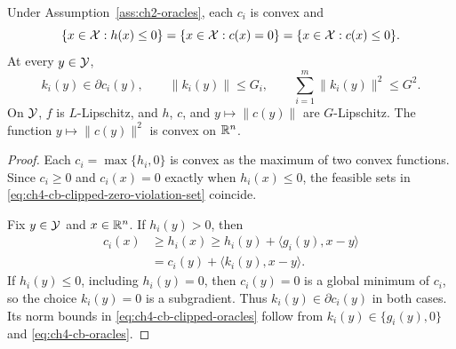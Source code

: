 \begin{Thm:Lemma}\label{lem:ch4-cb-lipschitz}
Under Assumption~\ref{ass:ch2-oracles}, each $c_i$ is convex and
\begin{equation}\label{eq:ch4-cb-clipped-zero-violation-set}
\{x\in\mathcal{X}:h(x)\le0\}
=\{x\in\mathcal{X}:c(x)=0\}
=\{x\in\mathcal{X}:c(x)\le0\}.
\end{equation}
At every $y\in\mathcal{Y}$,
\begin{equation}\label{eq:ch4-cb-clipped-oracles}
k_i(y)\in\partial c_i(y),\qquad
\|k_i(y)\|\le G_i,\qquad
\sum_{i=1}^m\|k_i(y)\|^2\le G^2.
\end{equation}
On $\mathcal{Y}$, $f$ is $L$-Lipschitz, and $h$, $c$, and $y\mapsto\|c(y)\|$
are $G$-Lipschitz. The function $y\mapsto\|c(y)\|^2$ is convex on
$\mathbb{R}^n$.
\end{Thm:Lemma}
\begin{proof}
Each $c_i=\max\{h_i,0\}$ is convex as the maximum of two convex
functions. Since $c_i\ge0$ and $c_i(x)=0$ exactly when $h_i(x)\le0$,
the feasible sets in \eqref{eq:ch4-cb-clipped-zero-violation-set} coincide.

Fix $y\in\mathcal{Y}$ and $x\in\mathbb{R}^n$. If $h_i(y)>0$, then
\begin{equation}\label{eq:ch4-cb-clipped-positive-subgradient}
\begin{aligned}
c_i(x)&\ge h_i(x)
\ge h_i(y)+\langle g_i(y),x-y\rangle\\
&=c_i(y)+\langle k_i(y),x-y\rangle.
\end{aligned}
\end{equation}
If $h_i(y)\le0$, including $h_i(y)=0$, then $c_i(y)=0$ is a
global minimum of $c_i$, so the choice $k_i(y)=0$ is a subgradient.
Thus $k_i(y)\in\partial c_i(y)$ in both cases. Its norm bounds in
\eqref{eq:ch4-cb-clipped-oracles} follow from
$k_i(y)\in\{g_i(y),0\}$ and \eqref{eq:ch4-cb-oracles}.


\end{proof}
